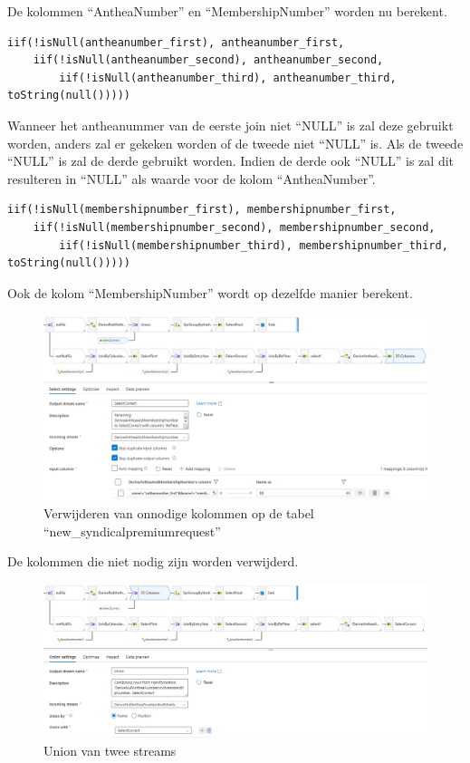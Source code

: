 De kolommen ``AntheaNumber'' en ``MembershipNumber'' worden nu berekent.

\begin{verbatim}
iif(!isNull(antheanumber_first), antheanumber_first,      
    iif(!isNull(antheanumber_second), antheanumber_second,
        iif(!isNull(antheanumber_third), antheanumber_third, toString(null()))))
\end{verbatim}

Wanneer het antheanummer van de eerste join niet ``NULL'' is zal deze gebruikt worden, anders zal er gekeken worden of de tweede niet ``NULL'' is. Als de tweede ``NULL'' is zal de derde gebruikt worden. Indien de derde ook ``NULL'' is zal dit resulteren in ``NULL'' als waarde voor de kolom ``AntheaNumber''.

\begin{verbatim}
iif(!isNull(membershipnumber_first), membershipnumber_first, 
    iif(!isNull(membershipnumber_second), membershipnumber_second,         
        iif(!isNull(membershipnumber_third), membershipnumber_third, toString(null()))))
\end{verbatim}

Ook de kolom ``MembershipNumber'' wordt op dezelfde manier berekent.

\begin{figure}[H]
    \centering
    \includegraphics[width=1\textwidth]{./graphics/adf/member_8.png}
    \caption{Verwijderen van onnodige kolommen op de tabel ``new\_syndicalpremiumrequest''}
\end{figure}

De kolommen die niet nodig zijn worden verwijderd.

\begin{figure}[H]
    \includegraphics[width=1\textwidth]{./graphics/adf/member_9.png}
    \caption{Union van twee streams}
\end{figure}

